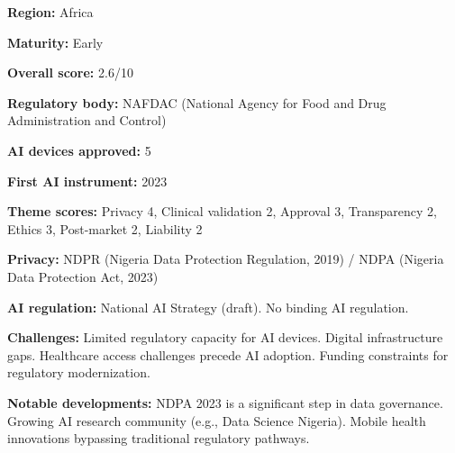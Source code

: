 \vspace{0.55em}
\par
\vspace{0.15em}
\noindent\textbf{Region:} Africa\par
\noindent\textbf{Maturity:} Early\par
\noindent\textbf{Overall score:} 2.6/10\par
\noindent\textbf{Regulatory body:} NAFDAC (National Agency for Food and Drug Administration and Control)\par
\noindent\textbf{AI devices approved:} 5\par
\noindent\textbf{First AI instrument:} 2023\par
\noindent\textbf{Theme scores:} Privacy 4, Clinical validation 2, Approval 3, Transparency 2, Ethics 3, Post-market 2, Liability 2\par
\noindent\textbf{Privacy:} NDPR (Nigeria Data Protection Regulation, 2019) / NDPA (Nigeria Data Protection Act, 2023)\par
\noindent\textbf{AI regulation:} National AI Strategy (draft). No binding AI regulation.\par
\noindent\textbf{Challenges:} Limited regulatory capacity for AI devices. Digital infrastructure gaps. Healthcare access challenges precede AI adoption. Funding constraints for regulatory modernization.\par
\noindent\textbf{Notable developments:} NDPA 2023 is a significant step in data governance. Growing AI research community (e.g., Data Science Nigeria). Mobile health innovations bypassing traditional regulatory pathways.\par
\endgroup
